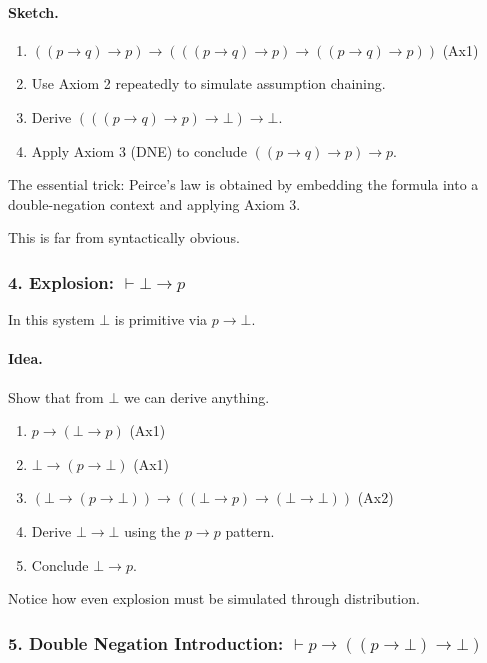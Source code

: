 \documentclass{article}
\begin{document}
\paragraph{Sketch.}

\begin{enumerate}
    \item $((p \to q) \to p) \to (((p \to q) \to p) \to ((p \to q) \to p))$ \hfill (Ax1)
    \item Use Axiom 2 repeatedly to simulate assumption chaining.
    \item Derive $(((p \to q) \to p) \to \bot) \to \bot$.
    \item Apply Axiom 3 (DNE) to conclude $((p \to q) \to p) \to p$.
\end{enumerate}

The essential trick:
Peirce’s law is obtained by embedding the formula into
a double-negation context and applying Axiom 3.

This is far from syntactically obvious.

\bigskip
\subsubsection*{4. Explosion: $\vdash \bot \to p$}

In this system $\bot$ is primitive via $p \to \bot$.

\paragraph{Idea.}
Show that from $\bot$ we can derive anything.

\begin{enumerate}
    \item $p \to (\bot \to p)$ \hfill (Ax1)
    \item $\bot \to (p \to \bot)$ \hfill (Ax1)
    \item $(\bot \to (p \to \bot)) \to ((\bot \to p) \to (\bot \to \bot))$ \hfill (Ax2)
    \item Derive $\bot \to \bot$ using the $p \to p$ pattern.
    \item Conclude $\bot \to p$.
\end{enumerate}

Notice how even explosion must be simulated through distribution.

\bigskip
\subsubsection*{5. Double Negation Introduction: $\vdash p \to ((p \to \bot) \to \bot)$}
\end{document}
